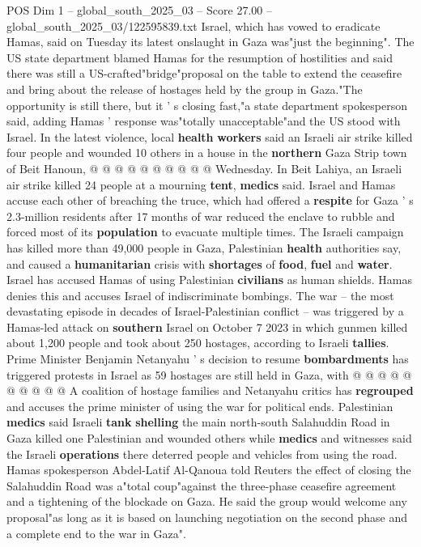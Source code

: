 \begin{textsample}{POS Dim 1 – global\_south\_2025\_03 – Score 27.00 – global\_south\_2025\_03/122595839.txt}
Israel, which has vowed to eradicate Hamas, said on Tuesday its latest onslaught in Gaza was"just the beginning".
The US state department blamed Hamas for the resumption of hostilities and said there was still a US-crafted"bridge"proposal on the table to extend the ceasefire and bring about the release of hostages held by the group in Gaza."The opportunity is still there, but it ' s closing fast,"a state department spokesperson said, adding Hamas ' response was"totally unacceptable"and the US stood with Israel.
In the latest violence, local \textbf{health} \textbf{workers} said an Israeli air strike killed four people and wounded 10 others in a house in the \textbf{northern} Gaza Strip town of Beit Hanoun, @ @ @ @ @ @ @ @ @ @ Wednesday.
In Beit Lahiya, an Israeli air strike killed 24 people at a mourning \textbf{tent}, \textbf{medics} said.
Israel and Hamas accuse each other of breaching the truce, which had offered a \textbf{respite} for Gaza ' s 2.3-million residents after 17 months of war reduced the enclave to rubble and forced most of its \textbf{population} to evacuate multiple times.
The Israeli campaign has killed more than 49,000 people in Gaza, Palestinian \textbf{health} authorities say, and caused a \textbf{humanitarian} crisis with \textbf{shortages} of \textbf{food}, \textbf{fuel} and \textbf{water}.
Israel has accused Hamas of using Palestinian \textbf{civilians} as human shields.
Hamas denies this and accuses Israel of indiscriminate bombings.
The war -- the most devastating episode in decades of Israel-Palestinian conflict -- was triggered by a Hamas-led attack on \textbf{southern} Israel on October 7 2023 in which gunmen killed about 1,200 people and took about 250 hostages, according to Israeli \textbf{tallies}.
Prime Minister Benjamin Netanyahu ' s decision to resume \textbf{bombardments} has triggered protests in Israel as 59 hostages are still held in Gaza, with @ @ @ @ @ @ @ @ @ @ A coalition of hostage families and Netanyahu critics has \textbf{regrouped} and accuses the prime minister of using the war for political ends.
Palestinian \textbf{medics} said Israeli \textbf{tank} \textbf{shelling} the main north-south Salahuddin Road in Gaza killed one Palestinian and wounded others while \textbf{medics} and witnesses said the Israeli \textbf{operations} there deterred people and vehicles from using the road.
Hamas spokesperson Abdel-Latif Al-Qanoua told Reuters the effect of closing the Salahuddin Road was a"total coup"against the three-phase ceasefire agreement and a tightening of the blockade on Gaza.
He said the group would welcome any proposal"as long as it is based on launching negotiation on the second phase and a complete end to the war in Gaza".

\end{textsample}
